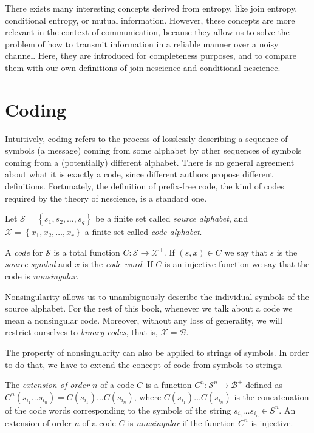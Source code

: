 There exists many interesting concepts derived from entropy, like join entropy, conditional entropy, or mutual information. However, these concepts are more relevant in the context of communication, because they allow us to solve the problem of how to transmit information in a reliable manner over a noisy channel. Here, they are introduced for completeness purposes, and to compare them with our own definitions of join nescience and conditional nescience.

%
%

\section{Coding}
\label{Codes}

Intuitively, coding refers to the process of losslessly describing a sequence of symbols (a message) coming from some alphabet by other sequences of symbols coming from a (potentially) different alphabet. There is no general agreement about what it is exactly a code, since different authors propose different definitions. Fortunately, the definition of prefix-free code, the kind of codes required by the theory of nescience, is a standard one.

Let $\mathcal{S}=\left\{ s_{1},s_{2},\ldots,s_{q}\right\}$ be a finite set called \emph{source alphabet}, and $\mathcal{X}=\left\{ x_{1}, x_{2}, \ldots, x_{r} \right\}$ a finite set called \emph{code alphabet}.

\begin{definition}[Code]
A \emph{code} for $\mathcal{S}$ is a total function $C:\mathcal{S}\rightarrow\mathcal{X}^{+}$. If $(s,x) \in C$ we say that $s$ is the \emph{source symbol} and $x$ is the \emph{code word}. If $C$ is an injective function we say that the code is \emph{nonsingular}.
\end{definition}

Nonsingularity allows us to unambiguously describe the individual symbols of the source alphabet. For the rest of this book, whenever we talk about a code we mean a nonsingular code. Moreover, without any loss of generality, we will restrict ourselves to \emph{binary codes}, that is, $\mathcal{X} = \mathcal{B}$.

The property of nonsingularity can also be applied to strings of symbols. In order to do that, we have to extend the concept of code from symbols to strings.

\begin{definition}
The \emph{extension of order $n$} of a code $C$ is a function $C^{n}:\mathcal{S}^{n}\rightarrow\mathcal{B}^{+}$ defined as $C^{n}(s_{i_1} \ldots s_{i_n}) = C(s_{i_1}) \ldots C(s_{i_n})$, where $C(s_{i_1}) \ldots C(s_{i_n})$ is the concatenation of the code words corresponding to the symbols of the string $s_{i_1} \ldots s_{i_n} \in {S}^{n}$. An extension of order $n$ of a code $C$ is \emph{nonsingular} if the function $C^{n}$ is injective.
\end{definition}

